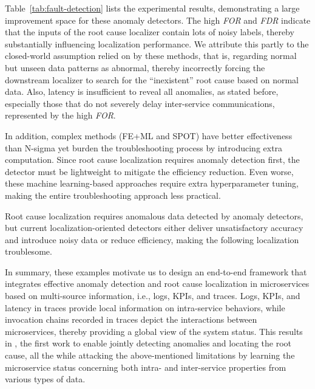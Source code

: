 Table~\ref{tab:fault-detection} lists the experimental results, demonstrating a large improvement space for these anomaly detectors. The high \textit{FOR} and \textit{FDR} indicate that the inputs of the root cause localizer contain lots of noisy labels, thereby substantially influencing localization performance.
We attribute this partly to the closed-world assumption relied on by these methods, that is, regarding normal but unseen data patterns as abnormal, thereby incorrectly forcing the downstream localizer to search for the ``inexistent'' root cause based on normal data.
Also, latency is insufficient to reveal all anomalies, as stated before, especially those that do not severely delay inter-service communications, represented by the high \textit{FOR}. 

In addition, complex methods (FE+ML and SPOT) have better effectiveness than N-sigma yet burden the troubleshooting process by introducing extra computation.
Since root cause localization requires anomaly detection first, the detector must be lightweight to mitigate the efficiency reduction. 
Even worse, these machine learning-based approaches require extra hyperparameter tuning, making the entire troubleshooting approach less practical.
\vspace{0.05in}
\begin{mybox}
    Root cause localization requires anomalous data detected by anomaly detectors, but current localization-oriented detectors either deliver unsatisfactory accuracy and introduce noisy data or reduce efficiency, making the following localization troublesome. 
\end{mybox}

In summary, these examples motivate us to design an end-to-end framework that integrates effective anomaly detection and root cause localization in microservices based on multi-source information, i.e., logs, KPIs, and traces.
Logs, KPIs, and latency in traces provide local information on intra-service behaviors, while invocation chains recorded in traces depict the interactions between microservices, thereby providing a global view of the system status.
This results in \name, the first work to enable jointly detecting anomalies and locating the root cause, all the while attacking the above-mentioned limitations by learning the microservice status concerning both intra- and inter-service properties from various types of data.
